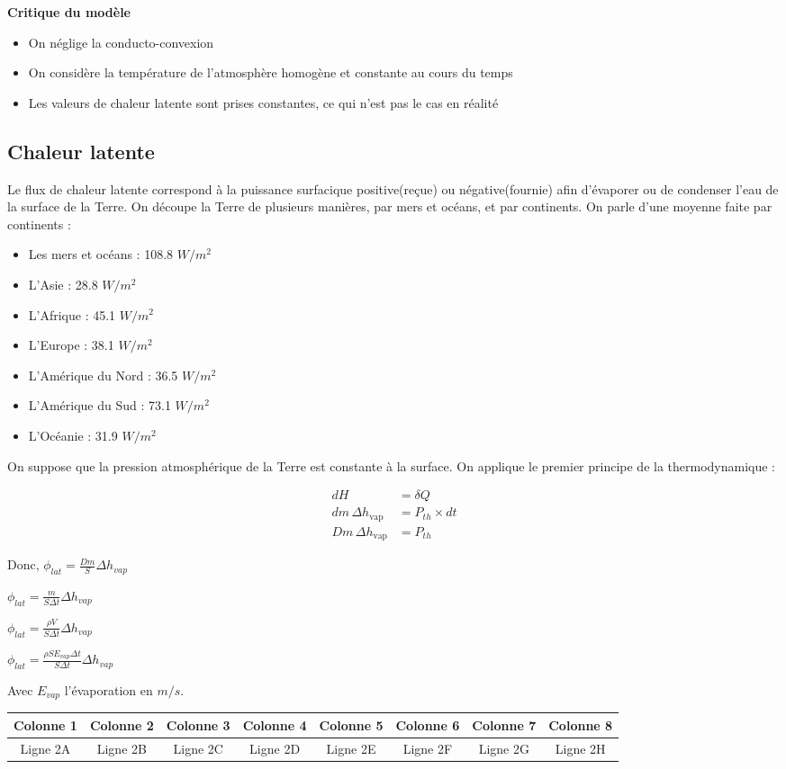 \documentclass[a4paper,12pt]{article}
\begin{document}
\textbf{Critique du modèle}
\begin{itemize}
    \item On néglige la conducto-convexion
    \item On considère la température de l'atmosphère homogène et constante au cours du temps
    \item Les valeurs de chaleur latente sont prises constantes, ce qui n'est pas le cas en réalité
\end{itemize}


\subsection*{Chaleur latente}


Le flux de chaleur latente correspond à la puissance surfacique positive(reçue) ou négative(fournie) afin d'évaporer ou de condenser l'eau de la surface de la Terre.
On découpe la Terre de plusieurs manières, par mers et océans, et par continents. 
On parle d'une moyenne faite par continents :
\begin{itemize}
    \item Les mers et océans : 108.8 $W/m^2$
    \item L'Asie : 28.8 $W/m^2$
    \item L'Afrique : 45.1 $W/m^2$
    \item L'Europe : 38.1 $W/m^2$
    \item L'Amérique du Nord : 36.5 $W/m^2$
    \item L'Amérique du Sud : 73.1 $W/m^2$
    \item L'Océanie : 31.9 $W/m^2$
\end{itemize}

On suppose que la pression atmosphérique de la Terre est constante à la surface. On applique le premier principe de la thermodynamique :

\vspace{1cm}
\begin{align*}
    dH &= \delta Q \\
    dm \, \Delta h_{\text{vap}} &= P_{th} \times dt \\
    Dm \, \Delta h_{\text{vap}} &= P_{th}
\end{align*}

Donc, $ \phi _{lat} = \frac{Dm}{S}\Delta h_{vap}$

$ \phi _{lat} = \frac{m}{S\Delta t}\Delta h_{vap}$


$ \phi _{lat} = \frac{\rho V}{S\Delta t}\Delta h_{vap}$

$ \phi _{lat} = \frac{\rho S E_{vap} \Delta t}{S\Delta t}\Delta h_{vap}$

Avec $E_{vap}$ l'évaporation en $m/s$.

\begin{tabular}{|c|c|c|c|c|c|c|c|}
\hline
Colonne 1 & Colonne 2 & Colonne 3 & Colonne 4 & Colonne 5 & Colonne 6 & Colonne 7 & Colonne 8 \\
\hline
Ligne 2A & Ligne 2B & Ligne 2C & Ligne 2D & Ligne 2E & Ligne 2F & Ligne 2G & Ligne 2H \\
\hline
\end{tabular}
\end{document}
